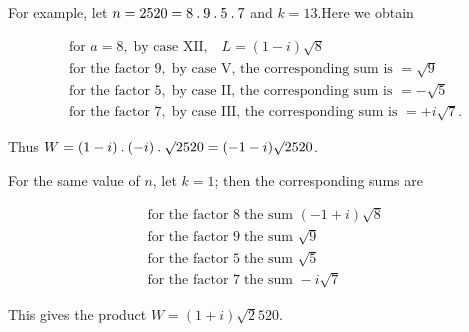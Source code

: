 
For example, let $n=2520=8\mathbin{.}9\mathbin{.}5\mathbin{.}7$ and $k=13$.\quad Here we obtain

{\small
\[
\begin{aligned}
&\text{for }a=8,\;\text{by case XII,}\quad L=(1-i)\surd8\\
&\text{for the factor }9,\;\text{by case V, the corresponding sum is }=\surd9\\
&\text{for the factor }5,\;\text{by case II, the corresponding sum is }=-\surd5\\
&\text{for the factor }7,\;\text{by case III, the corresponding sum is }=+i\surd7\mathord{.}
\end{aligned}
\]
}

Thus $W=(1-i)\mathbin{.}(-i)\mathbin{.}\surd2520=(-1-i)\surd2520$.

For the same value of $n$, let $k=1$; then the corresponding sums are

\[
\begin{aligned}
&\text{for the factor }8\;\text{the sum }(-1+i)\surd8\\
&\text{for the factor }9\;\text{the sum }\surd9\\
&\text{for the factor }5\;\text{the sum }\surd5\\
&\text{for the factor }7\;\text{the sum }-i\surd7
\end{aligned}
\]

This gives the product $W=(1+i)\surd2520$.
